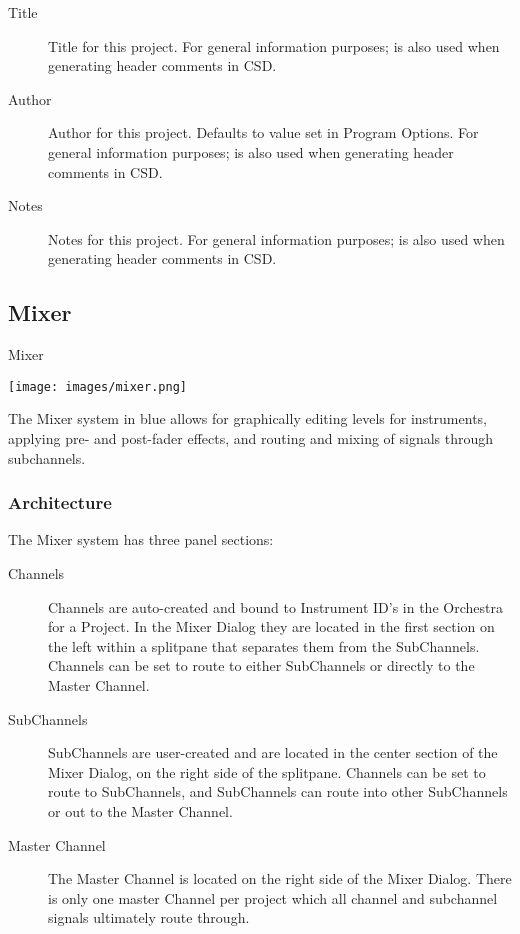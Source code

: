 \begin{description}
\item[Title]
Title for this project. For general information purposes; is also used
when generating header comments in CSD.
\item[Author]
Author for this project. Defaults to value set in Program Options. For
general information purposes; is also used when generating header
comments in CSD.
\item[Notes]
Notes for this project. For general information purposes; is also used
when generating header comments in CSD.
\end{description}

\subsection{Mixer}\label{mixer}

Mixer

\texttt{[image: images/mixer.png]}

The Mixer system in blue allows for graphically editing levels for
instruments, applying pre- and post-fader effects, and routing and
mixing of signals through subchannels.


\subsubsection{Architecture}

The Mixer system has three panel sections:

\begin{description}
\item[Channels]
Channels are auto-created and bound to Instrument ID's in the Orchestra
for a Project. In the Mixer Dialog they are located in the first section
on the left within a splitpane that separates them from the SubChannels.
Channels can be set to route to either SubChannels or directly to the
Master Channel.
\item[SubChannels]
SubChannels are user-created and are located in the center section of
the Mixer Dialog, on the right side of the splitpane. Channels can be
set to route to SubChannels, and SubChannels can route into other
SubChannels or out to the Master Channel.
\item[Master Channel]
The Master Channel is located on the right side of the Mixer Dialog.
There is only one master Channel per project which all channel and
subchannel signals ultimately route through.
\end{description}

